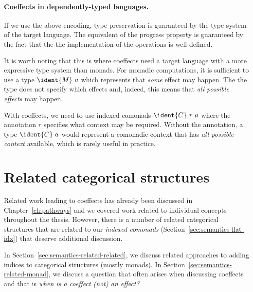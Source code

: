 \paragraph{Coeffects in dependently-typed languages.}
If we use the above encoding, type preservation is guaranteed by the type
system of the target language. The equivalent of the progress property is guaranteed by the
fact that the the implementation of the operations is well-defined.

It is worth noting that this is where coeffects need a target language with a more expressive
type system than monads. For monadic computations, it is sufficient to use a type $\ident{M}~a$
which represents that \emph{some} effect may happen. The the type does not specify which effects
and, indeed, this means that \emph{all possible effects} may happen.

With coeffects, we need to use indexed comonads $\ident{C}~r~a$ where the annotation $r$ specifies
what context may be required. Without the annotation, a type $\ident{C}~a$ would represent a
comonadic context that has \emph{all possible context} available, which is rarely useful in practice.



%
%

\section{Related categorical structures}
\label{sec:semantics-related}

Related work leading to coeffects has already been discussed in Chapter~\ref{ch:pathways}
and we covered work related to individual concepts throughout the thesis. However, there is a
number of related categorical structures that are related to our \emph{indexed comonads}
(Section~\ref{sec:semantics-flat-idx}) that deserve additional discussion.

In Section~\ref{sec:semantics-related-related}, we discuss related approaches to adding
indices to categorical structures (mostly monads). In Section~\ref{sec:semantics-related-monad},
we discuss a question that often arises when discussing coeffects and that is
\emph{when is a coeffect (not) an effect?}

